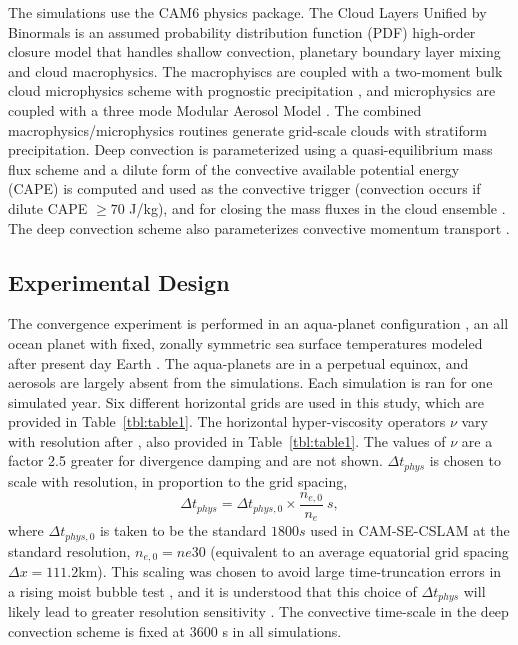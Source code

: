 The simulations use the CAM6 physics package. The Cloud Layers Unified by Binormals \citep[CLUBB][]{GETAL2002JAS,BOG2013JCLIM} is an assumed probability distribution function (PDF) high-order closure model that handles shallow convection, planetary boundary layer mixing and cloud macrophysics. The macrophyiscs are coupled with a two-moment bulk cloud microphysics scheme with prognostic precipitation \citep{MG2}, and microphysics are coupled with a three mode Modular Aerosol Model \citep{MAM}. The combined macrophysics/microphysics routines generate grid-scale clouds with stratiform precipitation. Deep convection is parameterized using a quasi-equilibrium mass flux scheme \citep{ZM1995AO} and a dilute form of the convective available potential energy (CAPE) is computed and used as the convective trigger (convection occurs if dilute CAPE $\geq 70$ J/kg), and for closing the mass fluxes in the cloud ensemble \citep{NRJ2008JC}. The deep convection scheme also parameterizes convective momentum transport \citep{RR2008JC}.

\subsection{Experimental Design}
 
The convergence experiment is performed in an aqua-planet configuration \citep{NH2000ASL,MWO2016JAMES}, an all ocean planet with fixed, zonally symmetric sea surface temperatures modeled after present day Earth \citep[$QOBS$ in][]{NH2000ASL}. The aqua-planets are in a perpetual equinox, and aerosols are largely absent from the simulations. Each simulation is ran for one simulated year. Six different horizontal grids are used in this study, which are provided in Table~\ref{tbl:table1}. The horizontal hyper-viscosity operators $\nu$ vary with resolution after \cite{HETAL2019JAMES}, also provided in Table~\ref{tbl:table1}. The values of $\nu$ are a factor 2.5 greater for divergence damping and are not shown. $\Delta t_{phys}$ is chosen to scale with resolution, in proportion to the grid spacing,
\begin{equation}
\Delta t_{phys} = \Delta t_{phys,0} \times \frac{n_{e,0}}{n_e}~s,\label{eq:dt-scale}
\end{equation}
where $\Delta t_{phys,0}$ is taken to be the standard $1800 s$ used in CAM-SE-CSLAM at the standard resolution, $n_{e,0} = ne30$ (equivalent to an average equatorial grid spacing $\Delta x = 111.2$km). This scaling was chosen to avoid large time-truncation errors in a rising moist bubble test \citep[Appendix A in][]{HETAL2019JAMES}, and it is understood that this choice of $\Delta t_{phys}$ will likely lead to greater resolution sensitivity \citep{W2008TELLUS}. The convective time-scale in the deep convection scheme is fixed at 3600 s in all simulations.
 
